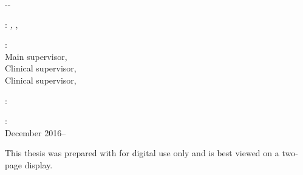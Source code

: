 \thispagestyle{empty}


\begin{adjustwidth*}{}{-\marginparsep-\marginparwidth}

\hfill

\vfill

\noindent\myName: \textit{\myTitle,} \mySubtitle, %
\myTime

\bigskip

\noindent{}: \\
Main supervisor, \myProf \\
Clinical supervisor, \myOtherProf \\
Clinical supervisor, \mySupervisor \\

\medskip

\noindent{}: \\
\myLocation

\medskip

\noindent{}: \\
December 2016--\myTime

\bigskip
\noindent This thesis was prepared with \texttt{\classicthesis} for digital use only and is best viewed on a two-page display.

\end{adjustwidth*}